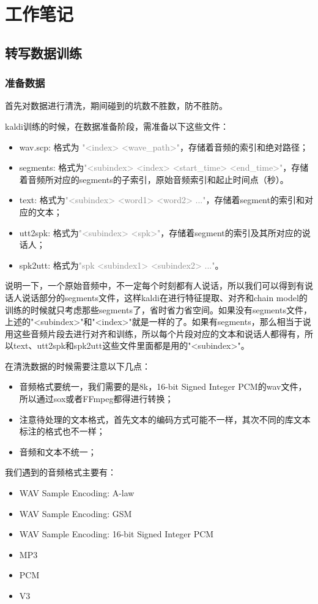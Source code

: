 \chapter{工作笔记}
\section{转写数据训练}
\subsection{准备数据}
首先对数据进行清洗，期间碰到的坑数不胜数，防不胜防。

kaldi训练的时候，在数据准备阶段，需准备以下这些文件：
\begin{itemize}
	\item wav.scp: 格式为 \textcolor{gray}{"<index> <wave\_path>"}，存储着音频的索引和绝对路径；
	\item segments: 格式为\textcolor{gray}{"<subindex> <index> <start\_time> <end\_time>"}，存储着音频所对应的segments的子索引，原始音频索引和起止时间点（秒）。
	\item text: 格式为\textcolor{gray}{"<subindex> <word1> <word2> ..."}，存储着segment的索引和对应的文本；
	\item utt2spk: 格式为\textcolor{gray}{"<subindex> <spk>"}，存储着segment的索引及其所对应的说话人；
	\item spk2utt: 格式为\textcolor{gray}{"spk <subindex1> <subindex2> ..."}。
\end{itemize}

说明一下，一个原始音频中，不一定每个时刻都有人说话，所以我们可以得到有说话人说话部分的segments文件，这样kaldi在进行特征提取、对齐和chain model的训练的时候就只考虑那些segments了，省时省力省空间。如果没有segments文件，上述的"<subindex>"和"<index>"就是一样的了。如果有segments，那么相当于说用这些音频片段去进行对齐和训练，所以每个片段对应的文本和说话人都得有，所以text、utt2spk和spk2utt这些文件里面都是用的"<subindex>"。

在清洗数据的时候需要注意以下几点：
\begin{itemize}
	\item 音频格式要统一，我们需要的是8k，16-bit Signed Integer PCM的wav文件，所以通过sox或者FFmpeg都得进行转换；
	\item 注意待处理的文本格式，首先文本的编码方式可能不一样，其次不同的库文本标注的格式也不一样；
	\item 音频和文本不统一；
\end{itemize}

我们遇到的音频格式主要有：
\begin{itemize}
	\item WAV Sample Encoding: A-law
	\item WAV Sample Encoding: GSM
	\item WAV Sample Encoding: 16-bit Signed Integer PCM
	\item MP3
	\item PCM
	\item V3
\end{itemize}

